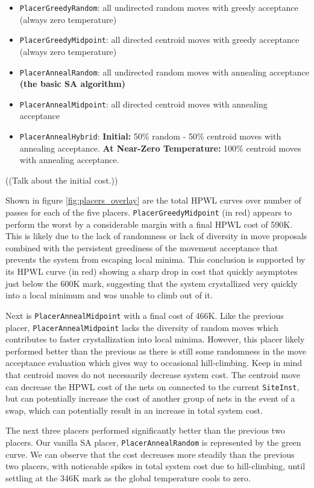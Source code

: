 \begin{itemize}
    \item \texttt{PlacerGreedyRandom}: all undirected random moves with greedy acceptance (always zero temperature)
    \item \texttt{PlacerGreedyMidpoint}: all directed centroid moves with greedy acceptance (always zero temperature)
    \item \texttt{PlacerAnnealRandom}: all undirected random moves with annealing acceptance \textbf{(the basic SA algorithm)}
    \item \texttt{PlacerAnnealMidpoint}: all directed centroid moves with annealing acceptance
    \item \texttt{PlacerAnnealHybrid}: \textbf{Initial:} 50\% random - 50\% centroid moves with annealing acceptance. \textbf{At Near-Zero Temperature:} 100\% centroid moves with annealing acceptance.
\end{itemize}

((Talk about the initial cost.))

Shown in figure \ref{fig:placers_overlay} are the total HPWL curves over number of passes for each of the five placers. 
\texttt{PlacerGreedyMidpoint} (in red) appears to perform the worst by a considerable margin with a final HPWL cost of 590K.
This is likely due to the lack of randomness or lack of diversity in move proposals combined with the persistent greediness of the movement acceptance that prevents the system from escaping local minima.
This conclusion is supported by its HPWL curve (in red) showing a sharp drop in cost that quickly asymptotes just below the 600K mark, suggesting that the system crystallized very quickly into a local minimum and was unable to climb out of it.

Next is \texttt{PlacerAnnealMidpoint} with a final cost of 466K.
Like the previous placer, \texttt{PlacerAnnealMidpoint} lacks the diversity of random moves which contributes to faster crystallization into local minima.
However, this placer likely performed better than the previous as there is still some randomness in the move acceptance evaluation which gives way to occasional hill-climbing. 
Keep in mind that centroid moves do not necessarily decrease system cost. 
The centroid move can decrease the HPWL cost of the nets on connected to the current \texttt{SiteInst}, but can potentially increase the cost of another group of nets in the event of a swap, which can potentially result in an increase in total system cost.

The next three placers performed significantly better than the previous two placers.
Our vanilla SA placer, \texttt{PlacerAnnealRandom} is represented by the green curve.
We can observe that the cost decreases more steadily than the previous two placers, with noticeable spikes in total system cost due to hill-climbing, until settling at the 346K mark as the global temperature cools to zero.

